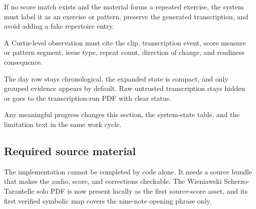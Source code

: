 \begin{description}[leftmargin=1.85em,style=nextline]
    \item[Exercise gate.] If no score match exists and the material forms a repeated exercise, the system must label it as an exercise or pattern, preserve the generated transcription, and avoid adding a fake repertoire entry.
    \item[Observation gate.] A Curtis-level observation must cite the clip, transcription event, score measure or pattern segment, issue type, repeat count, direction of change, and readiness consequence.
    \item[UI gate.] The day row stays chronological, the expanded state is compact, and only grouped evidence appears by default. Raw untrusted transcription stays hidden or goes to the transcription-run PDF with clear status.
    \item[Paper gate.] Any meaningful progress changes this section, the system-state table, and the limitation text in the same work cycle.
\end{description}

\subsection{Required source material}

The implementation cannot be completed by code alone. It needs a source bundle that makes the audio, score, and corrections checkable. The Wieniawski Scherzo-Tarantelle solo PDF is now present locally as the first source-score asset, and its first verified symbolic map covers the nine-note opening phrase only.

